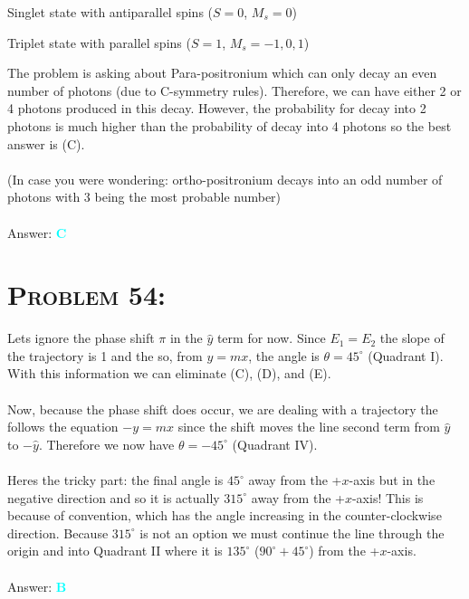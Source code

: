 \documentclass{article}
\begin{document}
\begin{description}\centering

\item[Para-positronium:] Singlet state with antiparallel spins ($S = 0$, $M_{s} = 0$)

\item[Ortho-positronium:] Triplet state with parallel spins ($S = 1$, $M_{s} = -1, 0, 1$)

\end{description}
The problem is asking about Para-positronium which can only decay an even number of photons (due to C-symmetry rules). Therefore, we can have either 2 or 4 photons produced in this decay. However, the probability for decay into 2 photons is much higher than the probability of decay into 4 photons so the best answer is (C).\\
\\
(In case you were wondering: ortho-positronium decays into an odd number of photons with 3 being the most probable number)
\\\\
Answer: \textbf{\textcolor{cyan}C}\\


\section{\textsc{Problem 54:}} 


Lets ignore the phase shift $\pi$ in the $\hat{y}$ term for now. Since $E_{1} = E_{2}$ the slope of the trajectory is 1 and the so, from $y = mx$, the angle is $\theta = 45^{\circ}$ (Quadrant I). With this information we can eliminate (C), (D), and (E).\\
\\
Now, because the phase shift does occur, we are dealing with a trajectory the follows the equation $-y = mx$ since the shift moves the line second term from $\hat{y}$ to $-\hat{y}$. Therefore we now have $\theta= - 45^{\circ}$ (Quadrant IV). \\
\\
Heres the tricky part: the final angle is $45^{\circ}$ away from the +$x$-axis but in the negative direction and so it is actually $315^{\circ}$ away from the +$x$-axis! This is because of convention, which has the angle increasing in the counter-clockwise direction. Because $315^{\circ}$ is not an option we must continue the line through the origin and into Quadrant II where it is $135^{\circ}$ ($90^{\circ}+ 45^{\circ}$) from the +$x$-axis.
\\\\
Answer: \textbf{\textcolor{cyan}B}\\
\end{document}
